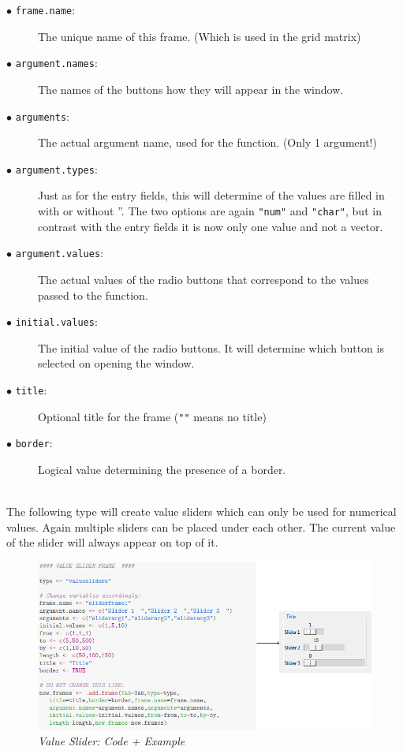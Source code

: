 \documentclass[a4paper]{article}\usepackage[]{graphicx}\usepackage[]{color}
\begin{document}
\begin{description}
  \item[$\bullet$ \texttt{frame.name}:] The unique name of this frame. (Which is used in the grid matrix)
  \item[$\bullet$ \texttt{argument.names}:] The names of the buttons how they
  will appear in the window.
  \item[$\bullet$ \texttt{arguments}:] The actual argument name, used for the
  function. (Only 1 argument!)
  \item[$\bullet$ \texttt{argument.types}:] Just as for the entry fields, this
  will determine of the values are filled in with or without ''. The two options
  are again \verb|"num"| and \verb|"char"|, but in contrast with the entry
  fields it is now only one value and not a vector.
  \item[$\bullet$ \texttt{argument.values}:] The actual values of the radio buttons 
that correspond to the values passed to the function. 
    \item[$\bullet$ \texttt{initial.values}:] The initial value of the radio
  buttons. It will determine which button is selected on opening the window.
  \item[$\bullet$ \texttt{title}:] Optional title for the frame (\verb|""| means no title)
  \item[$\bullet$ \texttt{border}:] Logical value determining the presence of a
  border.   

\end{description}

\\
The following type will create value sliders which can only be used for
numerical values. Again multiple sliders can be placed under each other. The
current value of the slider will always appear on top of it.

\begin{figure}[H]
\centering
\includegraphics[scale=0.5]{figures/slider.png}
\caption{{\it Value Slider: Code + Example}
\label{radiobuttons}}
\end{figure}
\end{document}
